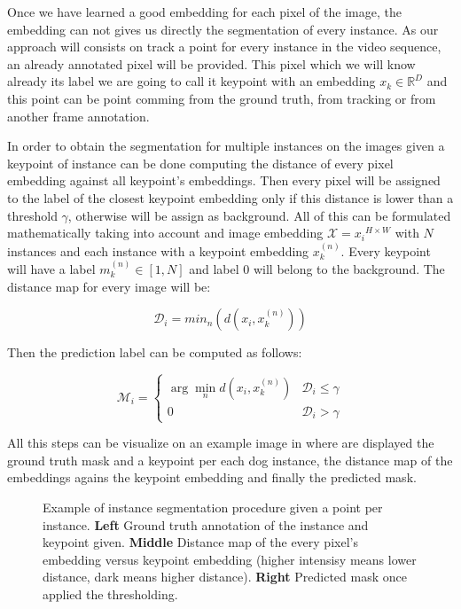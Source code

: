 Once we have learned a good embedding for each pixel of the image, the embedding can not gives us directly the segmentation of every instance.
As our approach will consists on track a point for every instance in the video sequence, an already annotated pixel will be provided.
This pixel which we will know already its label we are going to call it keypoint with an embedding $x_k \in \mathbb{R}^D$ and this point can be point comming from the ground truth, from tracking or from another frame annotation.

In order to obtain the segmentation for multiple instances on the images given a keypoint of instance can be done computing the distance of every pixel embedding against all keypoint's embeddings.
Then every pixel will be assigned to the label of the closest keypoint embedding only if this distance is lower than a threshold $\gamma$, otherwise will be assign as background.
All of this can be formulated mathematically taking into account and image embedding $\mathcal{X} = {x_i}^{H \times W}$ with $N$ instances and each instance with a keypoint embedding $x_k^{(n)}$.
Every keypoint will have a label $m_k^{(n)} \in [1, N]$ and label $0$ will belong to the background.
The distance map for every image will be:

\begin{equation}
  \mathcal{D}_i = min_n \left( d(x_i, x_k^{(n)}) \right)
\end{equation}

Then the prediction label can be computed as follows:

\begin{equation}
  \mathcal{M}_i = \begin{cases}
      \arg\min_n d(x_i, x_k^{(n)}) & \mathcal{D}_i \leq \gamma \\
      0 & \mathcal{D}_i > \gamma
   \end{cases}
\end{equation}

All this steps can be visualize on an example image in  where are displayed the ground truth mask and a keypoint per each dog instance, the distance map of the embeddings agains the keypoint embedding and finally the predicted mask.

\begin{figure}[h]
  \centering
  \caption{Example of instance segmentation procedure given a point per instance.
  \textbf{Left} Ground truth annotation of the instance and keypoint given.
  \textbf{Middle} Distance map of the every pixel's embedding versus keypoint embedding (higher intensisy means lower distance, dark means higher distance).
  \textbf{Right} Predicted mask once applied the thresholding. }
  \label{fig:instance_segmentation}
\end{figure}
